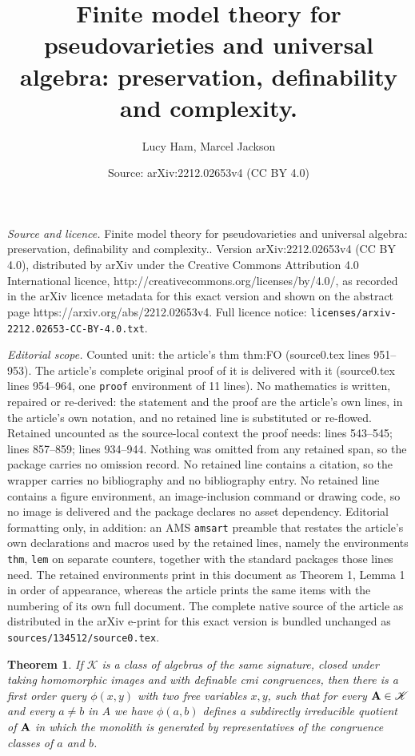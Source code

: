 \documentclass[10pt,a4paper]{amsart}
\title{Finite model theory for pseudovarieties and universal algebra: preservation, definability and complexity.}
\author{Lucy Ham, Marcel Jackson}
\date{Source: arXiv:2212.02653v4 (CC BY 4.0)}
\newtheorem{thm}{Theorem}
\begin{document}
\maketitle

\noindent\emph{Source and licence.} Finite model theory for pseudovarieties and universal algebra: preservation, definability and complexity.. Version arXiv:2212.02653v4 (CC BY 4.0), distributed by arXiv under the Creative Commons Attribution 4.0 International licence, http://creativecommons.org/licenses/by/4.0/, as recorded in the arXiv licence metadata for this exact version and shown on the abstract page https://arxiv.org/abs/2212.02653v4. Full licence notice: \texttt{licenses/arxiv-2212.02653-CC-BY-4.0.txt}.\par\smallskip

\noindent\textit{Editorial scope.} Counted unit: the article's thm thm:FO (source0.tex lines 951--953). The article's complete original proof of it is delivered with it (source0.tex lines 954--964, one \texttt{proof} environment of 11 lines). No mathematics is written, repaired or re-derived: the statement and the proof are the article's own lines, in the article's own notation, and no retained line is substituted or re-flowed.  Retained uncounted as the source-local context the proof needs: lines 543--545; lines 857--859; lines 934--944.  Nothing was omitted from any retained span, so the package carries no omission record.  No retained line contains a citation, so the wrapper carries no bibliography and no bibliography entry.  No retained line contains a figure environment, an image-inclusion command or drawing code, so no image is delivered and the package declares no asset dependency.  Editorial formatting only, in addition: an AMS \texttt{amsart} preamble that restates the article's own declarations and macros used by the retained lines, namely the environments \texttt{thm}, \texttt{lem} on separate counters, together with the standard packages those lines need.  The retained environments print in this document as Theorem 1, Lemma 1 in order of appearance, whereas the article prints the same items with the numbering of its own full document.  The complete native source of the article as distributed in the arXiv e-print for this exact version is bundled unchanged as \texttt{sources/134512/source0.tex}.
\begin{thm}\label{thm:fodecomp}
If $\mathscr{K}$ is a class of algebras of the same signature, closed under taking homomorphic images and with definable cmi congruences, then there is a first order query $\phi(x,y)$ with two free variables $x,y$, such that for every ${\bf A}\in \mathscr{K}$ and every $a\neq b$ in $A$ we have $\phi(a,b)$ defines a subdirectly irreducible quotient of ${\bf A}$ in which the monolith  is generated by representatives of the congruence classes of $a$ and $b$.
\end{thm}
\end{document}
